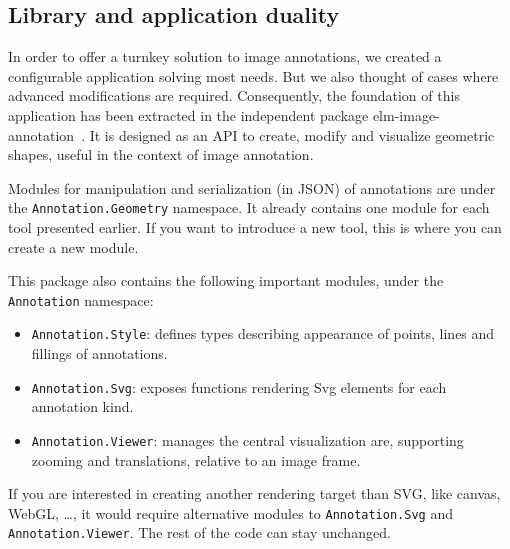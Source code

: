 

% 


\subsection{Library and application duality}

In order to offer a turnkey solution to image annotations,
we created a configurable application solving most needs.
But we also thought of cases where advanced modifications are required.
Consequently, the foundation of this application has been extracted
in the independent package elm-image-annotation~\cite{annotationpackage}.
It is designed as an API to create, modify and visualize geometric shapes,
useful in the context of image annotation.

Modules for manipulation and serialization (in JSON) of annotations are
under the \verb|Annotation.Geometry| namespace.
It already contains one module for each tool presented earlier.
If you want to introduce a new tool, this is where you can create a new module.

This package also contains the following important modules,
under the \verb|Annotation| namespace:
\begin{itemize}
	\item \verb|Annotation.Style|:
		defines types describing appearance of points, lines and fillings of annotations.
	\item \verb|Annotation.Svg|:
		exposes functions rendering Svg elements for each annotation kind.
	\item \verb|Annotation.Viewer|:
		manages the central visualization are,
		supporting zooming and translations, relative to an image frame.
\end{itemize}
If you are interested in creating another rendering target than SVG,
like canvas, WebGL, \ldots, it would require alternative modules
to \verb|Annotation.Svg| and \verb|Annotation.Viewer|.
The rest of the code can stay unchanged.
